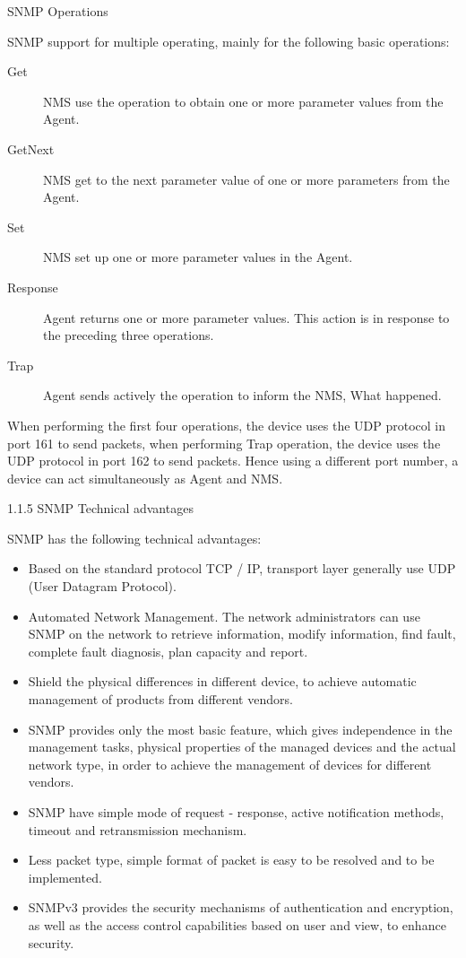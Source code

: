 SNMP Operations

SNMP support for multiple operating, mainly for the following basic operations:

\begin{description}
	\item[Get] NMS use the operation to obtain one or more parameter values from the Agent.
	\item[GetNext] NMS get to the next parameter value of one or more parameters from the Agent.
	\item[Set] NMS set up one or more parameter values in the Agent.
	\item[Response] Agent returns one or more parameter values. This action is in response to the preceding three operations.
	\item[Trap] Agent sends actively the operation to inform the NMS, What happened.
\end{description}

When performing the first four operations, the device uses the UDP protocol in port 161 to send packets, when performing Trap operation, the device uses the UDP protocol in port 162 to send packets. Hence using a different port number, a device can act simultaneously as Agent and NMS.

1.1.5 SNMP Technical advantages

SNMP has the following technical advantages:  

\begin{itemize}
	\item Based on the standard protocol TCP / IP, transport layer generally use UDP (User Datagram Protocol).  
	\item Automated Network Management. The network administrators can use SNMP on the network to retrieve information, modify information, find fault, complete fault diagnosis, plan capacity and report.  
	\item Shield the physical differences in different device, to achieve automatic management of products from different vendors.  
	\item SNMP provides only the most basic feature, which gives independence in the management tasks, physical properties of the managed devices and the actual network type, in order to achieve the management of devices for different vendors.  
	\item SNMP have simple mode of request - response, active notification methods, timeout and retransmission mechanism.  
	\item Less packet type, simple format of packet is easy to be resolved and to be implemented.  
	\item SNMPv3 provides the security mechanisms of authentication and encryption, as well as the access control capabilities based on user and view, to enhance security.
\end{itemize}

